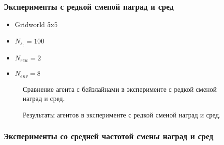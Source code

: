 \documentclass[a4paper]{article}
\begin{document}
\subsubsection{Эксперименты с редкой сменой наград и сред}

\begin{itemize}
  \item Gridworld 5x5
  \item $N_{s_0} = 100$
  \item $N_{rew} = 2$
  \item $N_{env} = 8$
\end{itemize}

\begin{figure}
  \centering
  \begin{minipage}{.49\linewidth}
    
  \end{minipage}
  \begin{minipage}{.49\linewidth}
    
  \end{minipage}
  \caption{Сравнение агента с бейзлайнами в эксперименте с редкой сменой наград и сред.}
\end{figure}

\begin{figure}
  \centering
  \begin{minipage}{.32\linewidth}
    
    
  \end{minipage}
  \begin{minipage}{.32\linewidth}
    
    
  \end{minipage}
  \begin{minipage}{.32\linewidth}
    
    
  \end{minipage}
  \caption{Результаты агентов в эксперименте с редкой сменой наград и сред.}
\end{figure}

\subsubsection{Эксперименты со средней частотой смены наград и сред}
\end{document}
